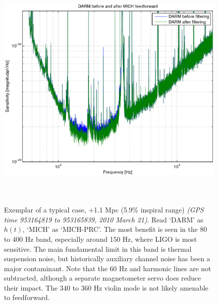 \begin{figure}
\begin{center}
\includegraphics[height=120mm, width=150mm]{figure11.eps}
\caption{Exemplar of a typical case, +1.1 Mpc (5.9\% inspiral range)
\textit{(GPS time 953164819 to 953165839, 2010 March 21)}. Read `DARM' as $h(t)$, `MICH' as `MICH-PRC'. The most benefit is seen in the 80 to 400 Hz band, especially around 150 Hz, where LIGO is most sensitive. The main fundamental limit in this band is thermal suspension noise, but historically auxiliary channel noise has been a major contaminant. Note that the 60 Hz and harmonic lines are not subtracted, although a separate magnetometer servo does reduce their impact. The 340 to 360 Hz violin mode is not likely amenable to feedforward.}
\label{typicalInspiralGraph}
\end{center}
\end{figure}
